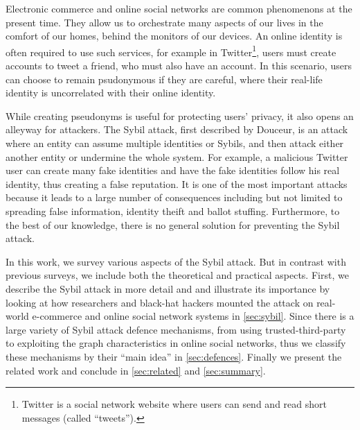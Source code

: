 Electronic commerce and online social networks are common phenomenons at the
present time. They allow us to orchestrate many aspects of our lives in the
comfort of our homes, behind the monitors of our devices. An online identity is
often required to use such services, for example in Twitter\footnote{Twitter is
  a social network website where users can send and read short messages (called
  ``tweets'').}, users must create accounts to tweet a friend, who must also
have an account. In this scenario, users can choose to remain psudonymous if
they are careful, where their real-life identity is uncorrelated with their
online identity. %

While creating pseudonyms is useful for protecting users' privacy, it also opens
an alleyway for attackers. The Sybil attack, first described by
Douceur\cite{douceur2002sybil}, is an attack where an entity can assume multiple
identities or Sybils, and then attack either another entity or undermine the
whole system. For example, a malicious Twitter user can create many fake
identities and have the fake identities follow his real identity, thus creating
a false reputation. It is one of the most important attacks because it leads to
a large number of consequences including but not limited to spreading false
information, identity theift\cite{bilge2009all} and ballot
stuffing\cite{bhattacharjee2005avoiding}. Furthermore, to the best of our
knowledge, there is no general solution for preventing the Sybil attack.

In this work, we survey various aspects of the Sybil attack. But in contrast
with previous surveys, we include both the theoretical and practical aspects.
First, we describe the Sybil attack in more detail and and illustrate its
importance by looking at how researchers and black-hat hackers mounted the
attack on real-world e-commerce and online social network systems in
\autoref{sec:sybil}. Since there is a large variety of Sybil attack defence
mechanisms, from using trusted-third-party to exploiting the graph
characteristics in online social networks, thus we classify these mechanisms by
their ``main idea'' in \autoref{sec:defences}. Finally we present the related
work and conclude in \autoref{sec:related} and \autoref{sec:summary}.

